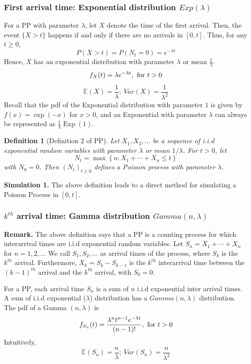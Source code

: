 \documentclass[11pt,a4paper]{article}
\newtheorem{definition}{Definition}
\begin{document}
\subsubsection{First arrival time: Exponential distribution $Exp(\lambda)$}
For a PP with parameter $\lambda$, let $X$ denote the time of the first arrival. Then, the event $\{X>t\}$ happens if and only if there are no arrivals in $[0, t]$. Thus, for any $t \geq 0$,
$$
P(X>t)=P\left(N_t=0\right)=e^{-\lambda t}
$$
Hence, $X$ has an exponential distribution with parameter $\lambda$ or mean $\frac{1}{\lambda}$.
$$f_{X}(t)=\lambda e^{-\lambda t},\ \textnormal{for } t>0$$
$$\mathbb{E}(X)=\frac{1}{\lambda};\ Var(X)=\frac{1}{\lambda^2}$$
Recall that the pdf of the Exponential distribution with parameter $1$ is given by $f(x)=\exp (-x)$ for $x>0$, and an Exponential with parameter $\lambda$ can always be represented as $\frac{1}{\lambda} \operatorname{Exp}(1)$.

\begin{definition}[Definition 2 of PP]
    Let $X_1, X_2, \ldots$ be a sequence of i.i.d exponential random variables with parameter $\lambda$ or mean $1 / \lambda$. For $t>0$, let
    $$
    N_t=\max \left\{n: X_1+\cdots+X_n \leq t\right\}
    $$
    with $N_0=0$. Then $\left(N_t\right)_{t \geq 0}$ defines a Poisson process with parameter $\lambda$.
\end{definition}
\textbf{Simulation 1.} The above definition leads to a direct method for simulating a Poisson Process in $[0, t]$.

\subsubsection{$k^{th}$ arrival time: Gamma distribution $Gamma(n,\lambda)$}

\textbf{Remark.} The above definition says that a PP is a counting process for which interarrival times are i.i.d exponential random variables. Let $S_n=X_1+\cdots+X_n$ for $n=1,2, \ldots$ We call $S_1, S_2, \ldots$ as arrival times of the process, where $S_k$ is the $k^{th}$ arrival. Furthermore, $X_k=S_k-S_{k-1}$ is the $k^{th}$ interarrival time between the $(k-1)^{th}$ arrival and the $k^{th}$ arrival, with $S_0=0$.

For a PP, each arrival time $S_n$ is a sum of $n$ i.i.d exponential inter arrival times. A sum of i.i.d exponential ($\lambda$) distribution has a $Gamma(n, \lambda)$ distribution. The pdf of a Gamma $(n, \lambda)$ is $$f_{S_n}(t)=\frac{\lambda^n t^{n-1}e^{-\lambda t}}{(n-1)!},\ \textnormal{for } t>0$$
Intuitively,
$$\mathbb{E}(S_n)=\frac{n}{\lambda};\ Var(S_n)=\frac{n}{\lambda^2}$$
\end{document}
